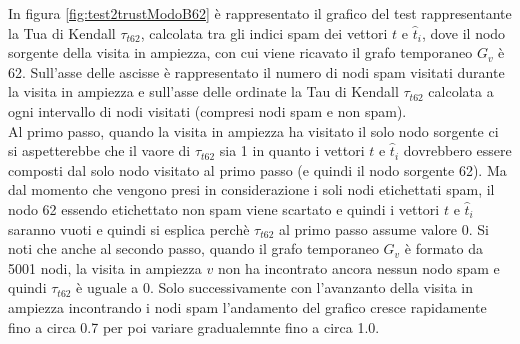 In figura \ref{fig:test2trustModoB62} è rappresentato il grafico del test rappresentante la Tua di Kendall \(\tau_{t62}\), calcolata tra gli indici spam dei vettori \(t\) e \(\hat{t}_i\), dove il nodo sorgente della visita in ampiezza, con cui viene ricavato il grafo temporaneo \(G_v\) è 62. Sull'asse delle ascisse è rappresentato il numero di nodi spam visitati durante la visita in ampiezza e sull'asse delle ordinate la Tau di Kendall \(\tau_{t62}\) calcolata a ogni intervallo di nodi visitati (compresi nodi spam e non spam).\\
Al primo passo, quando la visita in ampiezza ha visitato il solo nodo sorgente ci si aspetterebbe che il vaore di \(\tau_{t62}\) sia  1 in quanto i vettori \(t\) e \(\hat{t}_i\) dovrebbero essere composti dal solo nodo visitato al primo passo (e quindi il nodo sorgente 62).  Ma dal momento che vengono presi in considerazione i soli nodi etichettati spam, il nodo 62 essendo etichettato non spam  viene scartato e quindi i vettori \(t\) e \(\hat{t}_i\) saranno vuoti e quindi si esplica perchè \(\tau_{t62}\) al primo passo assume valore 0. Si noti che anche al secondo passo, quando il grafo temporaneo \(G_v\) è formato da 5001 nodi, la visita in ampiezza \(v\) non ha incontrato ancora nessun nodo spam e quindi \(\tau_{t62}\) è uguale a 0. Solo successivamente con l'avanzanto della visita in ampiezza  incontrando i nodi spam l'andamento del grafico cresce rapidamente fino a circa 0.7 per poi variare gradualemnte fino a circa 1.0. 

